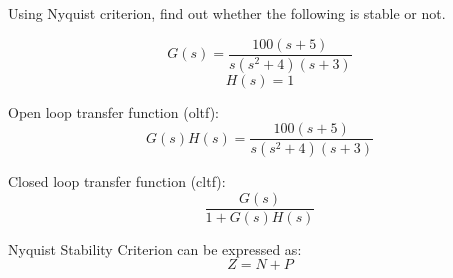 
\item Using Nyquist criterion, find out whether the following is stable or not.

\begin{equation}
    G(s) = \frac{100(s+5)}{s(s^2+4)(s+3)}
\end{equation}
\begin{equation}
    H(s) = 1
\end{equation}

\solution
Open loop transfer function (oltf):
\begin{equation} \label{eq:1}
    G(s)H(s) = \frac{100(s+5)}{s(s^2+4)(s+3)}
\end{equation}

Closed loop transfer function (cltf):
\begin{equation} \label{eq:2}
    \frac{G(s)}{1+G(s)H(s)}
\end{equation}

Nyquist Stability Criterion can be expressed as:
\begin{equation} \label{eq:3}
    Z = N + P
\end{equation}

